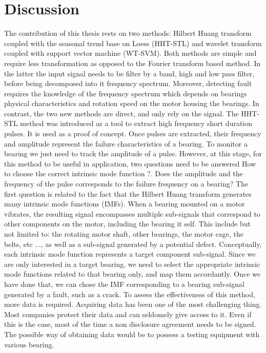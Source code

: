 \documentclass[../Main/thesis.tex]{subfiles}
\begin{document}
	\section{Discussion}
	\label{sec:discussion}
	The contribution of this thesis rests on two methods: Hilbert Huang transform coupled with the seasonal trend base on Loess (HHT-STL) and wavelet transform coupled with support vector machine (WT-SVM). Both methods are simple and require less transformation as opposed to the Fourier transform based method. In the latter the input signal needs to be filter by a band, high and low pass filter, before being decomposed into it frequency spectrum. Moreover, detecting fault requires the knowledge of the frequency spectrum which depends on bearings physical characteristics and rotation speed on the motor housing the bearings. In contrast, the two new methods are direct, and only rely on the signal.
	\justify
	The HHT-STL method was introduced as a tool to extract high frequency short duration pulses. It is used as a proof of concept. Once pulses are extracted, their frequency and amplitude represent the failure characteristics of a bearing. To monitor a bearing we just need to track the amplitude of a pulse. However, at this stage, for this method to be useful in application, two questions need to be answered 
	\justify
	How to choose the correct intrinsic mode function ?. Does the amplitude and the frequency of the pulse corresponds to the failure frequency on a bearing? 
	The first question is related to the fact that the Hilbert Huang transform generates many intrinsic mode functions (IMFs). When a bearing mounted on a motor vibrates, the resulting signal encompasses multiple sub-signals that correspond to other components on the motor, including the bearing it self. This include but not limited to: the rotating motor shaft, other bearings, the motor cage, the belts, etc $\dots$, as well as a sub-signal generated by a potential defect. Conceptually, each intrinsic mode function represents a target component sub-signal.
	Since we are only interested in a target bearing, we need to select the appropriate intrinsic mode functions related to that bearing only, and map them accordantly. Once we have done that, we can chose the IMF corresponding to a bearing sub-signal generated by a fault, such as a crack.
	\justify
	To assess the effectiveness of this method, more data is required. Acquiring data has been one of the most challenging thing. Most companies protect their data and can seldomely give access to it. Even if this is the case, most of the time a non disclosure agreement needs to be signed. The possible way of obtaining data would be to possess a testing equipment with various bearing.
\end{document}

